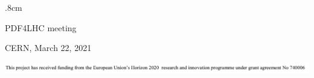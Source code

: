 \documentclass[a4,landscape]{seminar}
\newcommand{\1}{1\!\!\!1}
\begin{document}
\begin{slide}
\begin{center}
\vglue.8cm
\begin{minipage}{.49\linewidth}
\begin{flushleft}
  \vspace{.5cm}
{PDF4LHC meeting}
\end{flushleft}
\end{minipage}
\begin{minipage}{.49\linewidth}
\begin{flushright}
\vspace{.5cm}
{CERN, March 22, 2021} 
\end{flushright}
\end{minipage}
\includegraphics[width=.7\linewidth]{funding.png}
\end{center}
\end{slide}
\renewcommand{\slidestretch}{.7}
\end{document}
